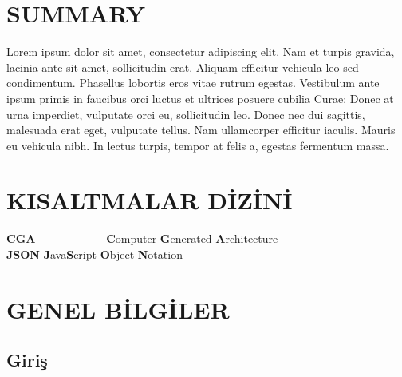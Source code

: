 \documentclass[12pt,turkish,a4paperpaper,]{report}
\begin{document}
\hypertarget{summary}{%
\chapter*{SUMMARY}\label{summary}}

Lorem ipsum dolor sit amet, consectetur adipiscing elit. Nam et turpis
gravida, lacinia ante sit amet, sollicitudin erat. Aliquam efficitur
vehicula leo sed condimentum. Phasellus lobortis eros vitae rutrum
egestas. Vestibulum ante ipsum primis in faucibus orci luctus et
ultrices posuere cubilia Curae; Donec at urna imperdiet, vulputate orci
eu, sollicitudin leo. Donec nec dui sagittis, malesuada erat eget,
vulputate tellus. Nam ullamcorper efficitur iaculis. Mauris eu vehicula
nibh. In lectus turpis, tempor at felis a, egestas fermentum massa.
\newpage {} \listoffigures

\newpage{}\listoftables{}

\hypertarget{kisaltmalar-dizini}{%
\chapter*{KISALTMALAR DİZİNİ}\label{kisaltmalar-dizini}}

\begin{tabbing}
\textbf{CGA}~~~~~~~~~~~~ \= \textbf{C}omputer \textbf{G}enerated \textbf{A}rchitecture \\  
\textbf{JSON} \> \textbf{J}ava\textbf{S}cript \textbf{O}bject \textbf{N}otation \\  
\end{tabbing}

\hypertarget{genel-bilgiler}{%
\chapter{GENEL BİLGİLER}\label{genel-bilgiler}}

\pagestyle{main}\thispagestyle{empty}

\hypertarget{giriux15f}{%
\section{Giriş}\label{giriux15f}}
\end{document}
